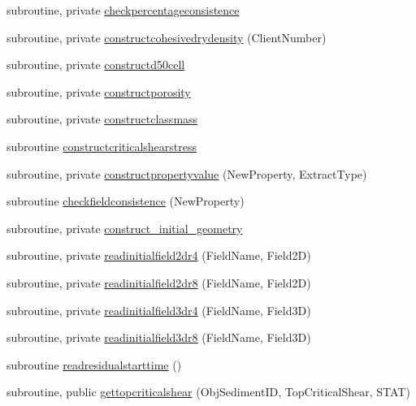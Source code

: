 \begin{DoxyCompactItemize}
subroutine, private \mbox{\hyperlink{namespacemodulesediment_ab89eafb956bc952759092de44da7a0b8}{checkpercentageconsistence}}
\item 
subroutine, private \mbox{\hyperlink{namespacemodulesediment_adc3a3328a47ba86ef363852158194846}{constructcohesivedrydensity}} (Client\+Number)
\item 
subroutine, private \mbox{\hyperlink{namespacemodulesediment_a595754027fca9b62be67b11dbad30185}{constructd50cell}}
\item 
subroutine, private \mbox{\hyperlink{namespacemodulesediment_a8ad0bd3e4a8a8ea6fb423df13967b877}{constructporosity}}
\item 
subroutine, private \mbox{\hyperlink{namespacemodulesediment_ae0fc128b081e1181c0df22dd4822b65d}{constructclassmass}}
\item 
subroutine \mbox{\hyperlink{namespacemodulesediment_a816e46154f7c824c75be6572b099e18a}{constructcriticalshearstress}}
\item 
subroutine, private \mbox{\hyperlink{namespacemodulesediment_a7df6a75fdbd4ab5caf95fe57492116fd}{constructpropertyvalue}} (New\+Property, Extract\+Type)
\item 
subroutine \mbox{\hyperlink{namespacemodulesediment_ade328a003b435bdea1339006c7c14db5}{checkfieldconsistence}} (New\+Property)
\item 
subroutine, private \mbox{\hyperlink{namespacemodulesediment_adb9b138d3feb285796bc8580b24509db}{construct\+\_\+initial\+\_\+geometry}}
\item 
subroutine, private \mbox{\hyperlink{namespacemodulesediment_a03d5ef49dd68eafdac5c93dab6c4e8de}{readinitialfield2dr4}} (Field\+Name, Field2D)
\item 
subroutine, private \mbox{\hyperlink{namespacemodulesediment_a260a1cba073b46d204c52ec103eb9f30}{readinitialfield2dr8}} (Field\+Name, Field2D)
\item 
subroutine, private \mbox{\hyperlink{namespacemodulesediment_a3b0c5a0377f0ab98b49b4e9d86627278}{readinitialfield3dr4}} (Field\+Name, Field3D)
\item 
subroutine, private \mbox{\hyperlink{namespacemodulesediment_a546771f8f141f33b0a8d1aa803131737}{readinitialfield3dr8}} (Field\+Name, Field3D)
\item 
subroutine \mbox{\hyperlink{namespacemodulesediment_a6afc209e64c494c64bdded6011c28e6e}{readresidualstarttime}} ()
\item 
subroutine, public \mbox{\hyperlink{namespacemodulesediment_ac51110b9c285467a4e284c185a4a98b1}{gettopcriticalshear}} (Obj\+Sediment\+ID, Top\+Critical\+Shear, S\+T\+AT)

\end{DoxyCompactItemize}
